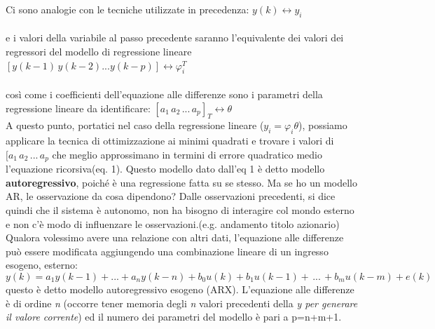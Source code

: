 \documentclass[10pt,a4paper]{article}
\begin{document}
Ci sono analogie con le tecniche utilizzate in precedenza: $ y(k) \longleftrightarrow y_{i} $  \\ \\
e i valori della variabile al passo precedente saranno l'equivalente dei valori dei regressori del modello di regressione lineare $ [y(k-1) \, y(k-2)...y(k-p)]\longleftrightarrow \varphi_{i}^{T} $ \\ \\
così come i coefficienti dell'equazione alle differenze sono i parametri della regressione lineare da identificare:
$ [a_{1}\,a_{2}\,...\,a_{p}]_{T} \longleftrightarrow \theta $ \\
A questo punto, portatici nel caso della regressione lineare ($ y_{i}=\varphi_{i}\theta $), possiamo applicare la tecnica di ottimizzazione ai minimi quadrati e trovare i valori di $ [a_{1}\,a_{2}\,...\,a_{p} $ che meglio approssimano in termini di errore quadratico medio l'equazione ricorsiva(eq. 1).
Questo modello dato dall'eq 1 è detto modello \textbf{autoregressivo}, poiché è una regressione fatta su se stesso.
Ma se ho un modello AR, le osservazione da cosa dipendono? Dalle osservazioni precedenti, si dice quindi che il sistema è autonomo, non ha bisogno di interagire col mondo esterno e non c'è modo di influenzare le osservazioni.(e.g. andamento titolo azionario)\\

Qualora volessimo avere una relazione con altri dati, l'equazione alle differenze può essere modificata aggiungendo una combinazione lineare di un ingresso esogeno, esterno:\\
\begin{equation}
y(k)=a_{1}y(k-1)+...+a_{n}y(k-n)+b_{0}u(k)+b_{1}u(k-1)+\,...\,+b_{m}u(k-m)+e(k)
\end{equation}
questo è detto modello autoregressivo esogeno (ARX).
L'equazione alle differenze è di ordine \textit{n} (occorre tener memoria degli \textit{n} valori precedenti della \textit{y per generare il valore corrente}) ed il numero dei parametri del modello è pari a p=n+m+1.
\end{document}
